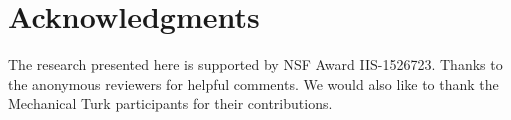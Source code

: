 \documentclass[letterpaper]{article} %
\begin{document}


\section{Acknowledgments}
The research presented here is supported by NSF
Award IIS-1526723.
Thanks to the anonymous reviewers for helpful comments. We would also like to thank the Mechanical Turk participants for their contributions.


 

\end{document}
